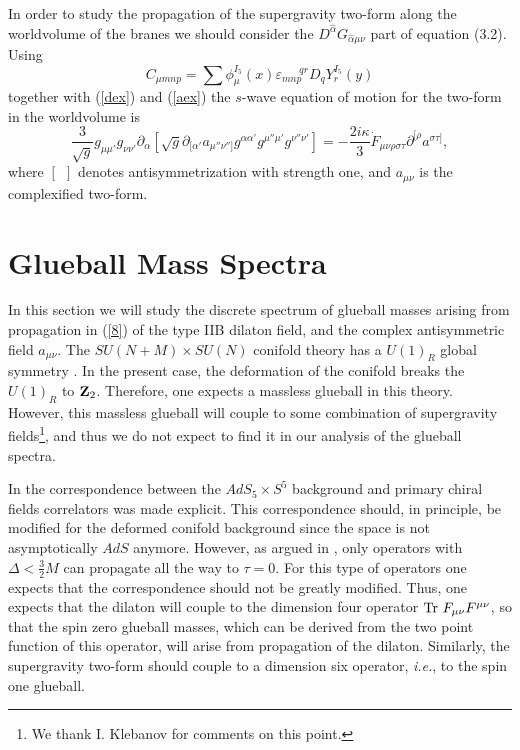 \documentclass[12pt,epsf,a4paper]{article}
\begin{document}
In order to study the propagation of the supergravity two-form along the worldvolume of the 
branes we should consider the $D^{\hat{\alpha}} G_{\hat{\alpha} \mu \nu}$ part of equation 
(3.2). Using
\begin{equation}
C_{\mu m n p} = \sum \phi_{\mu}^{I_5} (x) \varepsilon_{mnp}^{\: \: \: \: \: \: \: \: qr} 
D_q Y_r^{I_5} (y)
\end{equation}
together with  (\ref{dex}) and (\ref{aex})  the $s$-wave equation of motion 
for the two-form in the worldvolume  is
\begin{equation}
\frac {3}{\sqrt{g}} g_{\mu \mu'} g_{\nu \nu'} \partial_{\alpha} [ \sqrt{g} 
\partial_{[\alpha'} a_{\mu'' \nu'']} g^{\alpha \alpha'} g^{\mu'' \mu'} g^{\nu'' \nu'} ] 
= - \frac {2i \kappa}{3} {\dot F}_{\mu \nu \rho \sigma \tau} \partial^{[\rho} a^{\sigma \tau ]},
\label{aa}
\end{equation}
where $[ \: \: ]$ denotes antisymmetrization with strength one, and $a_{\mu \nu}$ is the 
complexified two-form.




\section{Glueball Mass Spectra}
  
In this section we will study the discrete spectrum of glueball masses
arising from propagation in (\ref{8}) of the type IIB dilaton field, and the complex antisymmetric 
field $a_{\mu \nu}$. The $SU(N+M) \times SU(N)$ conifold theory has a $U(1)_R$ global 
symmetry \cite{KT}. In the present case, the deformation of the conifold breaks the 
$U(1)_R$ to ${\bf Z}_2$. Therefore, one expects a massless glueball in this theory. However, 
this massless glueball will couple to some combination of supergravity fields\footnote{We 
thank I. Klebanov for comments on this point.}, and thus we do not expect to find it in our 
analysis of the glueball spectra.
  
In \cite{GKP,Witten1} the correspondence between the $AdS_5 
\times S^5$ background and primary chiral fields correlators was made explicit. 
This correspondence should, in principle, be modified for the deformed conifold background 
since the space is not asymptotically $AdS$ anymore. However, as argued in \cite{KS}, 
only operators with $\Delta < \frac {3}{2} M$ can propagate all the way to 
$\tau =0$. For this type of operators one expects that the correspondence should 
not be greatly modified. Thus, one expects that the dilaton will couple to the 
dimension four operator $\hbox {Tr } 
F_{\mu \nu} F^{\mu \nu}$, so that the spin zero glueball masses, which can be derived 
from the two point function of this operator, will arise from propagation of the dilaton. 
Similarly, the supergravity two-form should couple to a dimension six  
operator, {\it i.e.}, to the spin one glueball.
\end{document}
